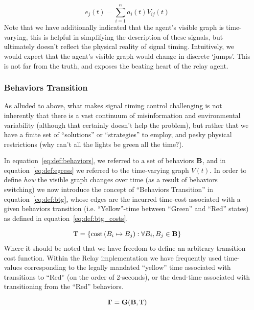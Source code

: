 \documentclass{report}
\newcommand{\Tau}{\mathrm{T}}
\begin{document}
\begin{equation}\label{eq:def:egress}
	e_j(t) = \sum_{i=1}^n a_i(t) V_{ij}(t)
\end{equation}
Note that we have additionally indicated that the agent's visible graph is time-varying, this is helpful in simplifying the description of these signals, but ultimately doesn't reflect the physical reality of signal timing.
Intuitively, we would expect that the agent's visible graph would change in discrete `jumps'.
This is not far from the truth, and exposes the beating heart of the relay agent.


\subsubsection{Behaviors Transition}
\label{sec:def:btg}

As alluded to above, what makes signal timing control challenging is not inherently that there is a vast continuum of misinformation and environmental variability (although that certainly doesn't help the problem), but rather that we have a finite set of ``solutions'' or ``strategies'' to employ, and pesky physical restrictions (why can't all the lights be green all the time?).

In equation~\eqref{eq:def:behaviors}, we referred to a set of behaviors $\bf{B}$, and in equation~\eqref{eq:def:egress} we referred to the time-varying graph $V(t)$.
In order to define \emph{how} the visible graph changes over time (as a result of behaviors switching) we now introduce the concept of ``Behaviors Transition'' in equation~\eqref{eq:def:btg}, whose edges are the incurred time-cost associated with a given behaviors transition (i.e. ``Yellow''-time between ``Green'' and ``Red'' states) as defined in equation~\eqref{eq:def:btg_costs}.

\begin{equation}\label{eq:def:btg_costs}
	\Tau = \{\mbox{cost}\left(B_i \mapsto B_j \right) : \forall B_i, B_j \in \bf{B} \}
\end{equation}
Where it should be noted that we have freedom to define an arbitrary transition cost function.
Within the Relay implementation we have frequently used time-values corresponding to the legally mandated ``yellow'' time associated with transitions to ``Red'' (on the order of 2-seconds), or the dead-time associated with transitioning from the ``Red'' behaviors.

\begin{equation}\label{eq:def:btg}
	\bf{\Gamma} = G(\bf{B}, \Tau)
\end{equation}
\end{document}
